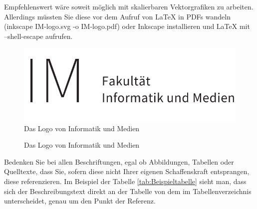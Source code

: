 Empfehlenswert wäre soweit möglich mit skalierbaren Vektorgrafiken zu arbeiten. Allerdings müssten Sie diese vor dem Aufruf von LaTeX in PDFs wandeln (inkscape IM-logo.svg -o IM-logo.pdf) oder Inkscape installieren und LaTeX mit --shell-escape aufrufen.

\begin{figure}[!t]
    \centering
    \includegraphics[scale=0.6]{Bilder/logos/IM-logo}
    \caption{Das Logo von Informatik und Medien }
\end{figure}

\begin{figure}[!t]
    \centering
    
    \caption{Das Logo von Informatik und Medien }
\end{figure}

Bedenken Sie bei allen Beschriftungen, egal ob Abbildungen, Tabellen oder Quelltexte, dass Sie, sofern diese nicht Ihrer eigenen Schaffenskraft entsprangen,
diese referenzieren. Im Beispiel der Tabelle \ref{tab:Beispieltabelle} sieht man, dass sich der Beschreibungstext direkt an der Tabelle von dem im Tabellenverzeichnis unterscheidet,
genau um den Punkt der Referenz.
